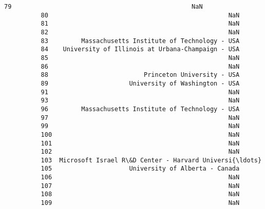 \documentclass[11pt]{article}
\begin{document}
\begin{Verbatim}[commandchars=\\\{\}]
          79                                                 NaN   
          80                                                 NaN   
          81                                                 NaN   
          82                                                 NaN   
          83         Massachusetts Institute of Technology - USA   
          84    University of Illinois at Urbana-Champaign - USA   
          85                                                 NaN   
          86                                                 NaN   
          88                          Princeton University - USA   
          89                      University of Washington - USA   
          91                                                 NaN   
          93                                                 NaN   
          96         Massachusetts Institute of Technology - USA   
          97                                                 NaN   
          99                                                 NaN   
          100                                                NaN   
          101                                                NaN   
          102                                                NaN   
          103  Microsoft Israel R\&D Center - Harvard Universi{\ldots}   
          105                     University of Alberta - Canada   
          106                                                NaN   
          107                                                NaN   
          108                                                NaN   
          109                                                NaN   
          

\end{Verbatim}
\end{document}
